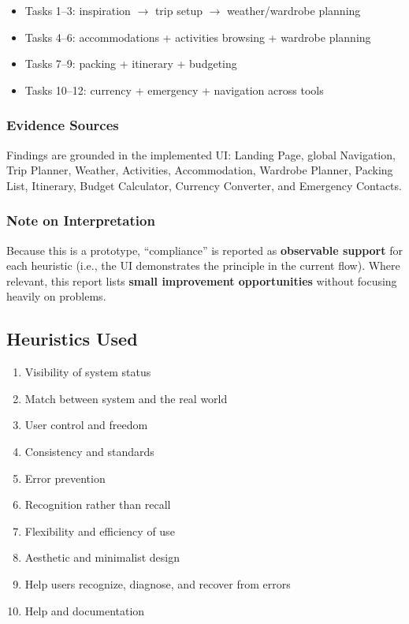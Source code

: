\documentclass[11pt,a4paper]{article}
\begin{document}
\begin{itemize}
    \item Tasks 1--3: inspiration $\rightarrow$ trip setup $\rightarrow$ weather/wardrobe planning
    \item Tasks 4--6: accommodations + activities browsing + wardrobe planning
    \item Tasks 7--9: packing + itinerary + budgeting
    \item Tasks 10--12: currency + emergency + navigation across tools
\end{itemize}

\subsubsection{Evidence Sources}
Findings are grounded in the implemented UI: Landing Page, global Navigation, Trip Planner, Weather, Activities, Accommodation, Wardrobe Planner, Packing List, Itinerary, Budget Calculator, Currency Converter, and Emergency Contacts.

\subsubsection{Note on Interpretation}
Because this is a prototype, ``compliance'' is reported as \textbf{observable support} for each heuristic (i.e., the UI demonstrates the principle in the current flow). Where relevant, this report lists \textbf{small improvement opportunities} without focusing heavily on problems.

\subsection{Heuristics Used}
\begin{enumerate}
    \item Visibility of system status
    \item Match between system and the real world
    \item User control and freedom
    \item Consistency and standards
    \item Error prevention
    \item Recognition rather than recall
    \item Flexibility and efficiency of use
    \item Aesthetic and minimalist design
    \item Help users recognize, diagnose, and recover from errors
    \item Help and documentation
\end{enumerate}
\end{document}
